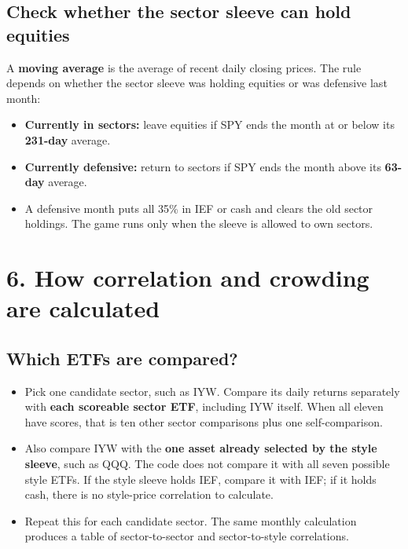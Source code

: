 \documentclass[11pt,letterpaper]{article}
\newcommand{\topic}[1]{\Needspace{5\baselineskip}\subsection*{#1}}
\newcommand{\guidepage}[1]{\clearpage\section*{#1}}
\begin{document}
\topic{Check whether the sector sleeve can hold equities}
A \textbf{moving average} is the average of recent daily closing prices. The rule depends on whether the sector sleeve was holding equities or was defensive last month:
\begin{itemize}
\item \textbf{Currently in sectors:} leave equities if SPY ends the month at or below its \textbf{231-day} average.
\item \textbf{Currently defensive:} return to sectors if SPY ends the month above its \textbf{63-day} average.
\item A defensive month puts all 35\% in IEF or cash and clears the old sector holdings. The game runs only when the sleeve is allowed to own sectors.
\end{itemize}

\guidepage{6. How correlation and crowding are calculated}
\topic{Which ETFs are compared?}
\begin{itemize}
\item Pick one candidate sector, such as IYW. Compare its daily returns separately with \textbf{each scoreable sector ETF}, including IYW itself. When all eleven have scores, that is ten other sector comparisons plus one self-comparison.
\item Also compare IYW with the \textbf{one asset already selected by the style sleeve}, such as QQQ. The code does not compare it with all seven possible style ETFs. If the style sleeve holds IEF, compare it with IEF; if it holds cash, there is no style-price correlation to calculate.
\item Repeat this for each candidate sector. The same monthly calculation produces a table of sector-to-sector and sector-to-style correlations.
\end{itemize}
\end{document}
